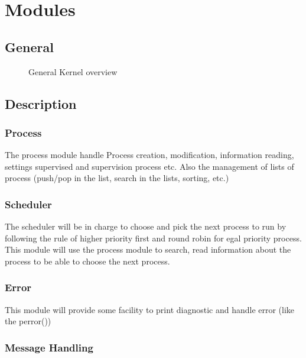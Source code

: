 \chapter{Modules}

\section{General}

\begin{figure}[h!]
  \begin{center}
	 
  \end{center}
  \caption{General Kernel overview}
  \label{fig:gen_kernel}
\end{figure}

\section{Description}
\subsection{Process}

The process module handle Process creation, modification, information reading, settings supervised and supervision process etc. Also the management of lists of process (push/pop in the list, search in the lists, sorting, etc.)

\subsection{Scheduler}

The scheduler will be in charge to choose and pick the next process to run by following the rule of higher priority first and round robin for egal priority process.
This module will use the process module to search, read information about the process to be able to choose the next process.

\subsection{Error}

This module will provide some facility to print diagnostic and handle error (like the perror())

\subsection{Message Handling}

